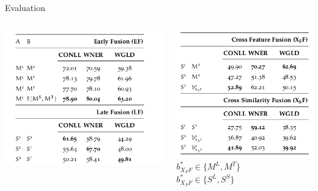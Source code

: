 \documentclass[10pt,xcolor=table]{beamer}
\newcommand\mlex{M^{\scriptscriptstyle L}}
\newcommand\mstd{M^{\scriptscriptstyle T}}
\newcommand\slex{S^{\scriptscriptstyle L}}
\newcommand\ssyn{S^{\scriptscriptstyle S}}
\begin{document}
\begin{frame}[t]{Evaluation}
\begin{columns}
	\begin{minipage}[c][.8\textheight][c]{\linewidth}
	\includegraphics[width=1\linewidth]{image2/Chapitre4/1F_1.png}
	\end{minipage}
	\begin{minipage}[c][0.8\textheight][c]{\linewidth}
	\includegraphics[width=1\linewidth]{image2/Chapitre4/1f_2.png}
	\\
	$b^*_{X_FF} \in \{\mlex, \mstd\}$
	\\
	$b^*_{X_SF} \in \{\slex, \ssyn\}$
	\end{minipage}
	\end{columns}
\end{frame}
\end{document}

